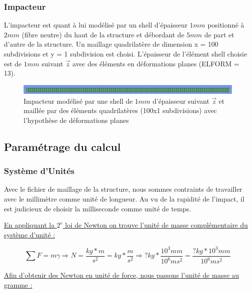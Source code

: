\documentclass[a4paper]{article}
\begin{document}
	\subsubsection{Impacteur}
	
	\hspace{0.5cm}L’impacteur est quant à lui modélisé par un shell d’épaisseur $1 mm$ positionné à $2 mm$ (fibre neutre) du haut de la structure et débordant de $5 mm$ de part et d'autre de la structure. Un maillage quadrilatère de dimension x = 100 subdivisions et y = 1 subdivision est choisi. L'épaisseur de l'élément shell choisie est de $1 mm$ suivant $\vec{z}$ avec des éléments en déformations planes (ELFORM = 13).
	
	\begin{figure}[H]
		\centering
		\includegraphics[width=16.5cm]{Images/8/8_1/ls_impacteur.png}
		\caption{Impacteur modélisé par une shell de $1 mm$ d’épaisseur suivant $\vec{z}$ et maillée par des éléments quadrilatères (100x1 subdivisions) avec l'hypothèse de déformations planes}
	\end{figure}
	\newpage
	
	\subsection{Paramétrage du calcul}
	\subsubsection{Système d'Unités}
	\hspace{0.5cm}Avec le fichier de maillage de la structure, nous sommes contraints de travailler avec le millimètre comme unité de longueur. Au vu de la rapidité de l’impact, il est judicieux de choisir la milliseconde comme unité de temps.
	
	\hspace{0.5cm}\underline{En appliquant la $2^{e}$ loi de Newton on trouve l’unité de masse complémentaire du système d’unité :}
	
	$$\sum{F} = m\gamma \Rightarrow N = \frac{kg * m}{s^{2}} = kg * \frac{m}{s^{2}} \Rightarrow ?kg * \frac{10^{3}mm}{10^{6}ms^{2}} = \frac{?kg * 10^{3}mm}{10^{6}ms^{2}}$$
	
	\hspace{0.5cm}\underline{Afin d'obtenir des Newton en unité de force, nous passons l'unité de masse au gramme :}
	
\end{document}
